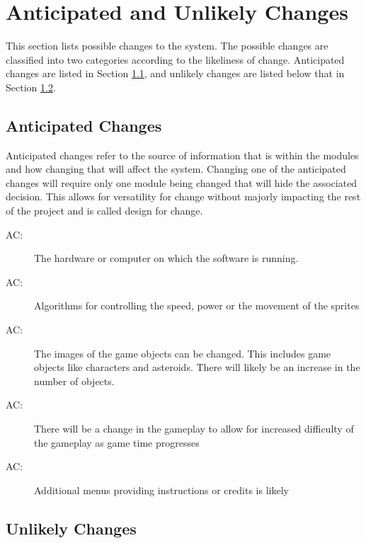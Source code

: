 \documentclass[12pt, titlepage]{article}
\newcounter{acnum}
\newcommand{\actheacnum}{AC\theacnum}
\begin{document}
\section{Anticipated and Unlikely Changes} \label{SecChange}

This section lists possible changes to the system. The possible changes are classified into two
categories according to the likeliness of change. Anticipated changes are listed in Section \ref{SecAchange}, and
unlikely changes are listed below that in Section \ref{SecUchange}.

\subsection{Anticipated Changes} \label{SecAchange}

Anticipated changes refer to the source of information that is within the modules and how changing that will affect the system. Changing one of the anticipated changes will require only one module being changed that will hide the associated decision. This allows for versatility for change without majorly impacting the rest of the project and is called design for change.

\begin{description}
\item[ \actheacnum \label{acHardware}:] The 
  hardware or computer on which the software is running.
\item[ \actheacnum \label{acAlg}:] Algorithms for controlling the speed, power or the movement of the sprites
\item[ \actheacnum \label{acObjects}:] The images of the game objects can be changed. This includes game objects like characters and asteroids. There will likely be an increase in the number of objects. 
\item[ \actheacnum \label{acPlay}:] There will be a change in the gameplay to allow for increased difficulty of the gameplay as game time progresses 
\item[ \actheacnum \label{acMenu}:] Additional menus providing instructions or credits is likely

\end{description}

\subsection{Unlikely Changes} \label{SecUchange}
\end{document}
